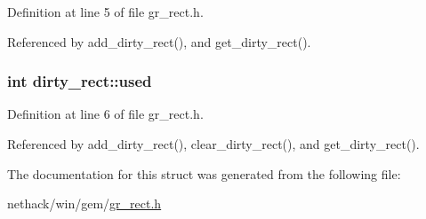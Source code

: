 Definition at line 5 of file gr\+\_\+rect.\+h.



Referenced by add\+\_\+dirty\+\_\+rect(), and get\+\_\+dirty\+\_\+rect().

\hypertarget{structdirty__rect_a67a9616d0e36086f65c7bf272fc3ebe4}{
\subsubsection[{used}]{\setlength{\rightskip}{0pt plus 5cm}int dirty\+\_\+rect\+::used}}\label{structdirty__rect_a67a9616d0e36086f65c7bf272fc3ebe4}


Definition at line 6 of file gr\+\_\+rect.\+h.



Referenced by add\+\_\+dirty\+\_\+rect(), clear\+\_\+dirty\+\_\+rect(), and get\+\_\+dirty\+\_\+rect().



The documentation for this struct was generated from the following file\+:\begin{DoxyCompactItemize}
\item 
nethack/win/gem/\hyperlink{gr__rect_8h}{gr\+\_\+rect.\+h}\end{DoxyCompactItemize}
